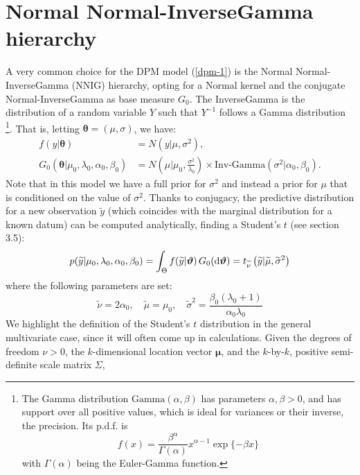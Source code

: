 \section{Normal Normal-InverseGamma hierarchy} \label{nnig}
A very common choice for the DPM model (\ref{dpm-1}) is the Normal Normal-InverseGamma (NNIG) hierarchy, opting for a Normal kernel and the conjugate Normal-InverseGamma as base measure $G_0$.
The InverseGamma is the distribution of a random variable $Y$ such that $Y^{-1}$ follows a Gamma distribution
\footnote{The Gamma distribution $\text{Gamma}(\alpha,\beta)$ has parameters $\alpha,\beta > 0$, and has support over all positive values, which is ideal for variances or their inverse, the precision.
Its p.d.f. is
$$f(x) = \frac{\beta^\alpha}{\Gamma(\alpha)} x^{\alpha-1} \exp\{-\beta x\}$$
with $\Gamma(\alpha)$ being the Euler-Gamma function.}.
That is, letting $\boldsymbol\theta=(\mu,\sigma)$, we have:
\begin{equation}
	\begin{aligned}
		f(y|\boldsymbol\theta)&=N(y| \mu ,\sigma^2),  \\
		G_0(\boldsymbol\theta|\mu_0,\lambda_0, \alpha_0, 	\beta_0)
		&=N\left(\mu | \mu_0 ,\frac{\sigma^2} {\lambda_0}\right) \times \text{Inv-Gamma}(\sigma^2|\alpha_0, \beta_0 ).
	\end{aligned}
\end{equation}
Note that in this model we have a full prior for $\sigma^2$ and instead a prior for $\mu$ that is conditioned on the value of $\sigma^2$.
Thanks to conjugacy, the predictive distribution for a new observation $\widetilde{y}$ (which coincides with the marginal distribution for a known datum) can be computed analytically, finding a Student's $t$ (see \cite{integral} section 3.5):
\begin{align*}
	p(\widetilde{y}|\mu_0,\lambda_0, \alpha_0, \beta_0) =
	\int_\Theta f(\widetilde{y}|\boldsymbol{\vartheta}) \, G_0(\mathrm d\boldsymbol{\vartheta}) =
	t_{\widetilde \nu}\left(\widetilde{y}|\widetilde{\mu},\widetilde{\sigma}^2\right)
\end{align*}
where the following parameters are set:
$$
	\widetilde{\nu}=2 \alpha_0, \quad
	\widetilde{\mu}=\mu_0, \quad
	\widetilde{\sigma}^2= \frac{\beta_0(\lambda_0+1)}{\alpha_0 \lambda_0}
$$
We highlight the definition of the Student's $t$ distribution in the general multivariate case, since it will often come up in calculations.
Given the degrees of freedom $\nu > 0$, the $k$-dimensional location vector $\boldsymbol\mu$, and the $k$-by-$k$, positive semi-definite scale matrix $\Sigma$,
